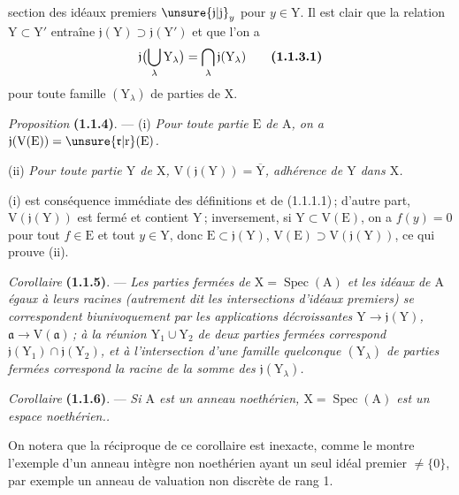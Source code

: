 \begingroup
\makeatletter
\tagsleft@true
\makeatother
section des idéaux premiers $\unsure{\mathfrak{j}|\mathrm{j}}_y$ pour $y\in \mathrm{Y}$. Il est clair que la relation $\mathrm{Y}\subset \mathrm{Y}'$ entraîne $\mathfrak{j}(\mathrm{Y})\supset\mathfrak{j}(\mathrm{Y}')$ et que l’on a
\[
\mathfrak{j}\bigl(\bigcup_{\lambda}\mathrm{Y}_{\lambda}\bigr)=\bigcap_{\lambda}\mathfrak{j}(\mathrm{Y}_{\lambda})
\tag*{\textbf{(1.1.3.1)}}
\]
pour toute famille $(\mathrm{Y}_{\lambda})$ de parties de $\mathrm{X}$.  

\textit{Proposition} \textbf{(1.1.4)}. --- (i) \textit{Pour toute partie $\mathrm{E}$ de $\mathrm{A}$, on a $\mathfrak{j}(\mathrm{V}(\mathrm{E}))=\unsure{\mathfrak{r}|\mathrm{r}}(\mathrm{E})$.}

(ii) \textit{Pour toute partie $\mathrm{Y}$ de $\mathrm{X}$, $\mathrm{V}(\mathfrak{j}(\mathrm{Y}))=\overline{\mathrm{Y}}$, adhérence de $\mathrm{Y}$ dans $\mathrm{X}$.}

(i) est conséquence immédiate des définitions et de (1.1.1.1)\,; d’autre part, $\mathrm{V}(\mathfrak{j}(\mathrm{Y}))$ est fermé et contient $\mathrm{Y}$\,; inversement, si $\mathrm{Y}\subset \mathrm{V}(\mathrm{E})$, on a $f(y)=0$ pour tout $f\in \mathrm{E}$ et tout $y\in \mathrm{Y}$, donc $\mathrm{E}\subset\mathfrak{j}(\mathrm{Y})$, $\mathrm{V}(\mathrm{E})\supset \mathrm{V}(\mathfrak{j}(\mathrm{Y}))$, ce qui prouve (ii).

\textit{Corollaire} \textbf{(1.1.5)}. --- \textit{Les parties fermées de $\mathrm{X}=\operatorname{Spec}(\mathrm{A})$ et les idéaux de $\mathrm{A}$ égaux à leurs racines (autrement dit les intersections d’idéaux premiers) se correspondent biunivoquement par les applications décroissantes $\mathrm{Y}\to\mathfrak{j}(\mathrm{Y})$, $\mathfrak{a}\to \mathrm{V}(\mathfrak{a})$\,; à la réunion $\mathrm{Y}_1\cup \mathrm{Y}_2$ de deux parties fermées correspond $\mathfrak{j}(\mathrm{Y}_1)\cap\mathfrak{j}(\mathrm{Y}_2)$, et à l’intersection d’une famille quelconque $(\mathrm{Y}_\lambda)$ de parties fermées correspond la racine de la somme des $\mathfrak{j}(\mathrm{Y}_\lambda)$.}

\textit{Corollaire} \textbf{(1.1.6)}. --- \textit{Si $\mathrm{A}$ est un anneau noethérien, $\mathrm{X}=\operatorname{Spec}(\mathrm{A})$ est un espace noethérien..}

On notera que la réciproque de ce corollaire est inexacte, comme le montre l’exemple d’un anneau intègre non noethérien ayant un seul idéal premier $\ne\{0\}$, par exemple un anneau de valuation non discrète de rang 1.

